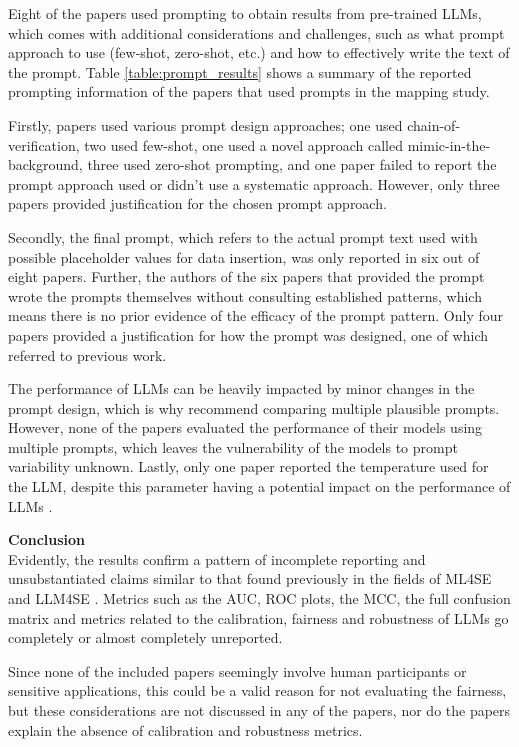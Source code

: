 \documentclass[a4paper]{article}
\begin{document}
Eight of the papers used prompting to obtain results from pre-trained LLMs, which comes with additional considerations and challenges, such as what prompt approach to use (few-shot, zero-shot, etc.) and how to effectively write the text of the prompt. Table \ref{table:prompt_results} shows a summary of the reported prompting information of the papers that used prompts in the mapping study. 

Firstly, papers used various prompt design approaches; one used chain-of-verification, two used few-shot, one used a novel approach called mimic-in-the-background, three used zero-shot prompting, and one paper failed to report the prompt approach used or didn't use a systematic approach. However, only three papers provided justification for the chosen prompt approach. 

Secondly, the final prompt, which refers to the actual prompt text used with possible placeholder values for data insertion, was only reported in six out of eight papers. Further, the authors of the six papers that provided the prompt wrote the prompts themselves without consulting established patterns, which means there is no prior evidence of the efficacy of the prompt pattern. Only four papers provided a justification for how the prompt was designed, one of which referred to previous work.

The performance of LLMs can be heavily impacted by minor changes in the prompt design, which is why \textcite{sclar2024quantifyinglanguagemodelssensitivity} recommend comparing multiple plausible prompts. However, none of the papers evaluated the performance of their models using multiple prompts, which leaves the vulnerability of the models to prompt variability unknown. Lastly, only one paper reported the temperature used for the LLM, despite this parameter having a potential impact on the performance of LLMs \cite{peeperkorn2024}.

\textbf{Conclusion}\\
Evidently, the results confirm a pattern of incomplete reporting and unsubstantiated claims similar to that found previously in the fields of ML4SE \cite{Dellanna2022} and LLM4SE \cite{hou2024}. Metrics such as the AUC, ROC plots, the MCC, the full confusion matrix and metrics related to the calibration, fairness and robustness of LLMs go completely or almost completely unreported.

Since none of the included papers seemingly involve human participants or sensitive applications, this could be a valid reason for not evaluating the fairness, but these considerations are not discussed in any of the papers, nor do the papers explain the absence of calibration and robustness metrics. 
\end{document}
